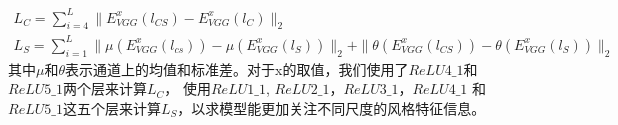\begin{equation}
    \label{equ:cal_perceptual_loss_cs}
    \begin{gathered}
        L_{C} = \sum_{i=4}^{L} \parallel E_{VGG}^{x}(l_{CS}) - E_{VGG}^{x}(l_{C}) \parallel_{2} \\
        L_{S} = \sum_{i=1}^{L} \parallel \mu(E_{VGG}^{x}(l_{cs})) - \mu(E_{VGG}^{x}(l_{S})) \parallel_{2} + \parallel \theta(E_{VGG}^{x}(l_{CS})) - \theta(E_{VGG}^{x}(l_{S})) \parallel_{2}
    \end{gathered}
\end{equation}
其中$\mu$和$\theta$表示通道上的均值和标准差。对于x的取值，我们使用了$ReLU4\_1$和$ReLU5\_1$两个层来计算$L_C$，
使用$ReLU1\_1$, $ReLU2\_1$，$ReLU3\_1$，$ReLU4\_1$
和$ReLU5\_1$这五个层来计算$L_S$，以求模型能更加关注不同尺度的风格特征信息。


